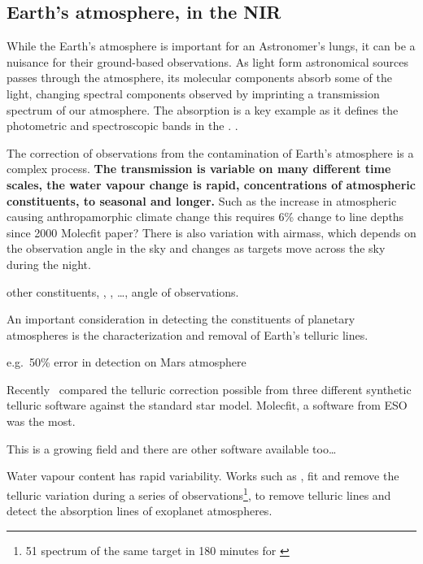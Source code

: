 

\subsection{Earth's atmosphere, in the NIR}
While the Earth's atmosphere is important for an Astronomer's lungs, it can be a nuisance for their ground-based observations.
As light form astronomical sources passes through the atmosphere, its molecular components absorb some of the light, changing spectral components observed by imprinting a transmission spectrum of our atmosphere.
The  absorption is a key example as it defines the photometric and spectroscopic bands in the \nir{}. .

The correction of observations from the contamination of Earth's atmosphere is a complex process.\textbf{
    The transmission is variable on many different time scales, the water vapour change is rapid, concentrations of atmospheric constituents, to seasonal and longer.}
Such as the increase in atmospheric  causing anthropamorphic climate change this requires 6\% change to  line depths since 2000 Molecfit paper?
There is also variation with airmass, which depends on the observation angle in the sky and changes as targets move across the sky during the night.

other constituents, , ,  \ldots{}, angle of observations.

An important consideration in detecting the constituents of planetary atmospheres is the characterization and removal of Earth's telluric lines.

e.g.\ 50\% error in  detection on Mars atmosphere


Recently~\citet{ulmer-moll_telluric_2018} compared the telluric correction possible from three different synthetic telluric software against the standard star model.
Molecfit, a software from ESO was the most.

This is a growing field and there are other software available too\ldots{}


Water vapour content has rapid variability.
Works such as \citet{snellen_orbital_2010}, fit and remove the telluric variation during a series of observations\footnote{51 spectrum of the same target in 180 minutes for \citet{snellen_orbital_2010}}, to remove telluric lines and detect the absorption lines of exoplanet atmospheres.


